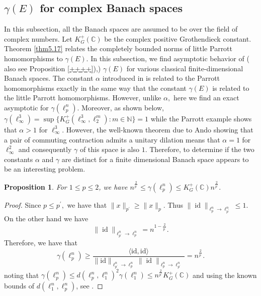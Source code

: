 \documentclass[a4paper,oneside,11pt, reqno]{amsart}
\numberwithin{equation}{section}
\newtheorem{proposition}[theorem]{Proposition}
\theoremstyle{plain}
\begin{document}
\subsection{$\gamma(E)$ for complex Banach spaces} In this subsection, all the Banach spaces are assumed to be over the field of complex numbers. Let $K_G^{+}(\mathbb C)$ be the complex positive Grothendieck constant. Theorem \ref{thm5.17} relates the completely bounded norms of little Parrott homomorphisms to $\gamma(E)$. In this subsection, we  find asymptotic behavior of ( also see Proposition \ref{++++}),) $\gamma(E)$  for various classical finite-dimensional Banach spaces. 
The constant $\alpha$ introduced in \cite{vip} is related to the Parrott homomorphisms exactly in the same way that the constant $\gamma(E)$ is related to the little Parrott homomorphisms. 
However, unlike $\alpha,$ here we find an exact asymptotic for $\gamma(\ell_p^n)$. Moreover, as shown below, $\gamma(\ell^3_\infty) = \sup \{K_G^{+}(\ell_\infty^3,\ell_2^m): m\in \mathbb{N}\} = 1$ while the Parrott example shows that $\alpha > 1$ for $\ell_\infty^3$.  However, the well-known theorem due to Ando showing that a pair of commuting contraction admits a unitary dilation means that $\alpha=1$ for $\ell_\infty^2$ and consequently $\gamma$ of this space is also $1$. Therefore, to determine if the two constants $\alpha$ and $\gamma$ are distinct for a finite dimensional Banach space appears to be an interesting problem.
\begin{proposition} \label{prop5.12}
 For $1\leqslant p\leqslant 2$, we have $n^{\frac{2}{p^\prime}}\leqslant\gamma(\ell_p^n)\leqslant K_G^{+}(\mathbb C)n^{\frac{2}{p^\prime}}.$
\end{proposition}
\begin{proof}
Since $p\leqslant p^\prime,$ we have that $\|x\|_{p^\prime}\geqslant\|x\|_p.$ Thus $\|\operatorname{id}\|_{\ell_p^n\to\ell_{p^\prime}^n}\leqslant 1.$ On the other hand we have \[\|\operatorname{id}\|_{\ell_{p^\prime}^n\to\ell_p^n}=n^{1-\frac{2}{p^\prime}}.\] Therefore, we have that \[\gamma(\ell_p^n)\geqslant \frac{\langle \text{id},\text{id}\rangle }{\|\text{id}\|_{\ell_{p^\prime}^n\to\ell_p^n}\|\operatorname{id}\|_{\ell_{p}^n\to\ell_{p^\prime}^n}}=n^{\frac{2}{p^\prime}}.\]  noting that $\gamma(\ell_p^n)\leqslant d(\ell_p^n,\ell_1^n)^2\gamma(\ell_1^n)\leqslant n^{\frac{2}{p^\prime}}K_G^{+}(\mathbb C)$ and using the known bounds of $d(\ell_1^n,\ell_p^n)$, see \cite[Proposition 37.6]{Tom89}. %
\end{proof}
\end{document}
